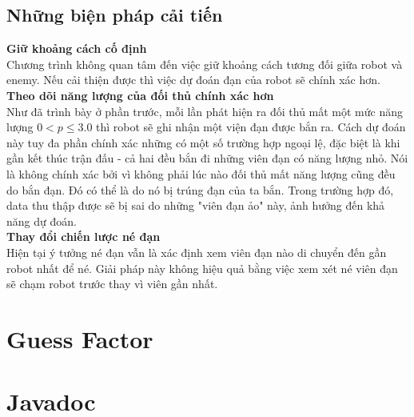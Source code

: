 \documentclass[14pt]{article}
\begin{document}
\subsection{Những biện pháp cải tiến}
{\bf Giữ khoảng cách cố định}\\
Chương trình không quan tâm đến việc giữ khoảng cách tương đối giữa robot và enemy. Nếu cải thiện được thì việc dự đoán đạn của robot sẽ chính xác hơn.\\
{\bf Theo dõi năng lượng của đối thủ chính xác hơn}\\
Như đã trình bày ở phần trước, mỗi lần phát hiện ra đối thủ mất một mức năng lượng $0 < p \leq 3.0$ thì robot sẽ ghi nhận một viện đạn được bắn ra. Cách dự đoán này tuy đa phần chính xác những có một số trường hợp ngoại lệ, đặc biệt là khi gần kết thúc trận đấu - cả hai đều bắn đi những viên đạn có năng lượng nhỏ. Nói là không chính xác bởi vì không phải lúc nào đối thủ mất năng lượng cũng đều do bắn đạn. Đó có thể là do nó bị trúng đạn của ta bắn. Trong trường hợp đó, data thu thập được sẽ bị sai do những "viên đạn ảo" này, ảnh hưởng đến khả năng dự đoán.\\
{\bf Thay đổi chiến lược né đạn}\\
Hiện tại ý tưởng né đạn vẫn là xác định xem viên đạn nào di chuyển đến gần robot nhất để né. Giải pháp này không hiệu quả bằng việc xem xét né viên đạn sẽ chạm robot trước thay vì viên gần nhất.
\section{Guess Factor}
\section{Javadoc}
\end{document}
